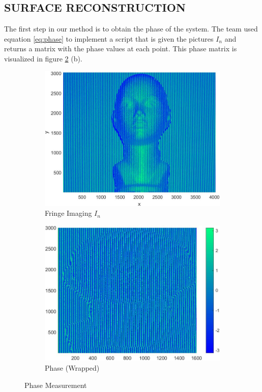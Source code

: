 \subsection{SURFACE RECONSTRUCTION}
The first step in our method is to obtain the phase of the system. The team used equation \ref{eq:phase} to implement a script that is given the pictures $I_n$ and returns a matrix with the phase values at each point. This phase matrix is visualized in figure \ref{fig:Wrapped_Phase} (b).  

\begin{figure} [H]
     \centering
     \begin{subfigure}[b]{0.22\textwidth}
         \centering
         \includegraphics[width=\textwidth]{Figures/Fringe_Imaging.jpg}
         \caption{Fringe Imaging $I_n$}
         \label{fig:Fringe_Imaging}
     \end{subfigure}
     \hfill
     \begin{subfigure}[b]{0.22\textwidth}
         \centering
         \includegraphics[width=\textwidth]{Figures/Wrapped_Phase.jpg}
         \caption{Phase (Wrapped)}
     \end{subfigure}
        \caption{Phase Measurement}
        \label{fig:Wrapped_Phase}
\end{figure}

